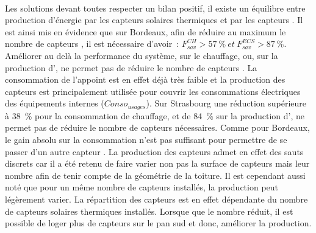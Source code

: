 \paragraph{} %
Les solutions devant toutes respecter un bilan positif, il existe un équilibre entre
production d’énergie par les capteurs solaires thermiques et par les capteurs .
Il est ainsi mis en évidence que sur Bordeaux, afin de réduire au maximum le nombre
de capteurs , il est nécessaire d’avoir~:
$F_{sav}^{CH} > \SI{57}{\percent} \ et \ F_{sav}^{ECS} > \SI{87}{\percent}$.
Améliorer au delà la performance du système, sur le chauffage, ou, sur la production
d’, ne permet pas de réduire le nombre de capteurs . La consommation de
l’appoint est en effet déjà très faible et la production des capteurs  est
principalement utilisée pour couvrir les consommations électriques des équipements
internes ($Conso_{usages}$). Sur Strasbourg une réduction supérieure à \SI{38}{\percent}
pour la consommation de chauffage, et de \SI{84}{\percent} sur la production d’,
ne permet pas de réduire le nombre de capteurs  nécessaires. Comme pour Bordeaux,
le gain absolu sur la consommation n’est pas suffisant pour permettre de se passer d’un
autre capteur . La production des capteurs  admet en effet des sauts
discrets car il a été retenu de faire varier non pas la surface de capteurs mais leur
nombre afin de tenir compte de la géométrie de la toiture. Il est cependant aussi noté que
pour un même nombre de capteurs installés, la production peut légèrement varier. La
répartition des capteurs  est en effet dépendante du nombre de capteurs solaires
thermiques installés. Lorsque que le nombre réduit, il est possible de loger plus de
capteurs  sur le pan sud et donc, améliorer la production.

